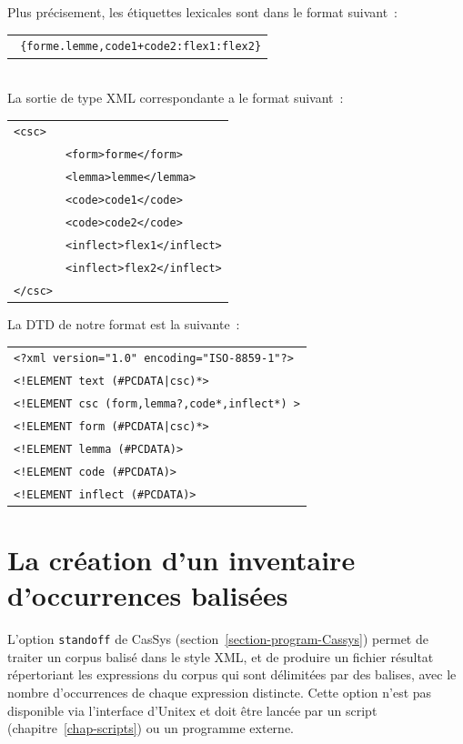 Plus précisement, les étiquettes lexicales sont dans le format suivant~:\\
\begin{tabular}{c}
\texttt{
\{forme.lemme,code1+code2:flex1:flex2\}}
\end{tabular}\\
La sortie de type XML correspondante a le format suivant~:\\
\begin{tabular}{ll}
\texttt{<csc>}&\\
	&\texttt{<form>forme</form>}\\
	&\texttt{<lemma>lemme</lemma>}\\
	&\texttt{<code>code1</code>}\\
	&\texttt{<code>code2</code>}\\
	&\texttt{<inflect>flex1</inflect>}\\
	&\texttt{<inflect>flex2</inflect>}\\
\texttt{</csc>}&\\
\end{tabular}

La DTD de notre format est la suivante~:

\begin{tabular}{l}
\texttt{<?xml version="1.0" encoding="ISO-8859-1"?>}\\
\texttt{<!ELEMENT text (\#PCDATA|csc)*>}\\
\texttt{<!ELEMENT csc (form,lemma?,code*,inflect*) >}\\
\texttt{<!ELEMENT form (\#PCDATA|csc)*>}\\
\texttt{<!ELEMENT lemma (\#PCDATA)>}\\
\texttt{<!ELEMENT code (\#PCDATA)>}\\
\texttt{<!ELEMENT inflect (\#PCDATA)>}\\
\end{tabular}


\section{La création d'un inventaire d'occurrences balisées}
\label{section-standOff}

L'option \verb$standoff$ de CasSys (section~\ref{section-program-Cassys}) permet de traiter
un corpus balisé dans le style XML, et de produire un fichier résultat répertoriant les expressions du
corpus qui sont délimitées par des balises, avec le nombre d'occurrences de chaque expression distincte.
Cette option n'est pas disponible via l'interface d'Unitex et doit être lancée par un script
(chapitre~\ref{chap-scripts}) ou un programme externe.

